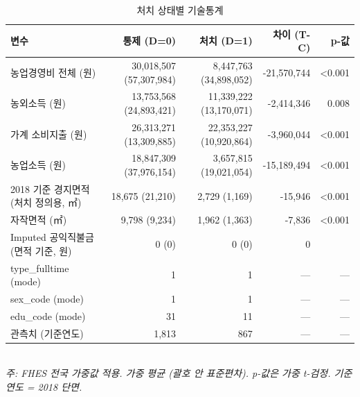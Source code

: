 \begin{table}[t]
\centering
\caption{처치 상태별 기술통계}
\label{tab:descriptives_ko}
\begin{tabular}{lrrrr}
\toprule
변수 & 통제 (D=0) & 처치 (D=1) & 차이 (T-C) & p-값 \\
\midrule
농업경영비 전체 (원) & 30,018,507 (57,307,984) & 8,447,763 (34,898,052) & -21,570,744 & <0.001 \\
농외소득 (원) & 13,753,568 (24,893,421) & 11,339,222 (13,170,071) & -2,414,346 & 0.008 \\
가계 소비지출 (원) & 26,313,271 (13,309,885) & 22,353,227 (10,920,864) & -3,960,044 & <0.001 \\
농업소득 (원) & 18,847,309 (37,976,154) & 3,657,815 (19,021,054) & -15,189,494 & <0.001 \\
2018 기준 경지면적 (처치 정의용, ㎡) & 18,675 (21,210) & 2,729 (1,169) & -15,946 & <0.001 \\
자작면적 (㎡) & 9,798 (9,234) & 1,962 (1,363) & -7,836 & <0.001 \\
Imputed 공익직불금 (면적 기준, 원) & 0 (0) & 0 (0) & 0 &  \\
type_fulltime (mode) & 1 & 1 & --- & --- \\
sex_code (mode) & 1 & 1 & --- & --- \\
edu_code (mode) & 31 & 11 & --- & --- \\
관측치 (기준연도) & 1,813 & 867 & --- & --- \\
\bottomrule
\end{tabular}
\\
\footnotesize\textit{주: FHES 전국 가중값 적용. 가중 평균 (괄호 안 표준편차). p-값은 가중 t-검정. 기준연도 = 2018 단면.}
\end{table}

